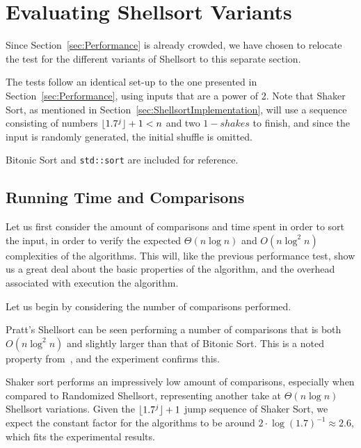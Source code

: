 \section{Evaluating Shellsort Variants}
\label{sec:ShellsortExperiments}

Since Section~\ref{sec:Performance} is already crowded, we have chosen to relocate the test for the different variants of Shellsort to this separate section.

The tests follow an identical set-up to the one presented in Section~\ref{sec:Performance}, using inputs that are a power of 2. Note that Shaker Sort, as mentioned in Section~\ref{sec:ShellsortImplementation}, will use a sequence consisting of numbers $\lfloor1.7^j\rfloor+1 < n$ and two $1-shakes$ to finish, and since the input is randomly generated, the initial shuffle is omitted.

Bitonic Sort and \texttt{std::sort} are included for reference. 

\subsection{Running Time and Comparisons}

Let us first consider the amount of comparisons and time spent in order to sort the input, in order to verify the expected $\Theta(n \log n)$ and $O(n \log^2 n)$ complexities of the algorithms. This will, like the previous performance test, show us a great deal about the basic properties of the algorithm, and the overhead associated with execution the algorithm.

Let us begin by considering the number of comparisons performed.

Pratt's Shellsort can be seen performing a number of comparisons that is both $O(n \log ^2 n)$ and slightly larger than that of Bitonic Sort. This is a noted property from~, and the experiment confirms this.

Shaker sort performs an impressively low amount of comparisons, especially when compared to Randomized Shellsort, representing another take at $\Theta(n \log n)$ Shellsort variations. Given the $\lfloor1.7^j\rfloor+1$ jump sequence of Shaker Sort, we expect the constant factor for the algorithms to be around $2\cdot \log(1.7)^{-1} \approx 2.6$, which fits the experimental results.

